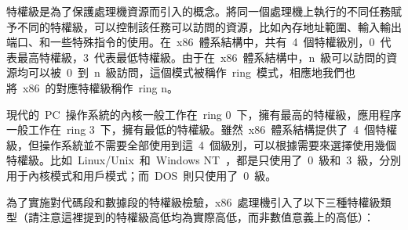 特權級是為了保護處理機資源而引入的概念。將同一個處理機上執行的不同任務賦予不同的特權級，可以控制該任務可以訪問的資源，比如內存地址範圍、輸入輸出端口、和一些特殊指令的使用。在~x86~體系結構中，共有~4~個特權級別，0~代表最高特權級，3~代表最低特權級。由于在~x86~體系結構中，n~級可以訪問的資源均可以被~0~到~n~級訪問，這個模式被稱作~ring~模式，相應地我們也將~x86~的對應特權級稱作~ring n。

現代的~PC~操作系統的內核一般工作在~ring 0~下，擁有最高的特權級，應用程序一般工作在~ring 3~下，擁有最低的特權級。雖然~x86~體系結構提供了~4~個特權級，但操作系統並不需要全部使用到這~4~個級別，可以根據需要來選擇使用幾個特權級。比如~Linux/Unix~和~Windows NT~，都是只使用了~0~級和~3~級，分別用于內核模式和用戶模式；而~DOS~則只使用了~0~級。

為了實施對代碼段和數據段的特權級檢驗，x86~處理機引入了以下三種特權級類型（請注意這裡提到的特權級高低均為實際高低，而非數值意義上的高低）：

